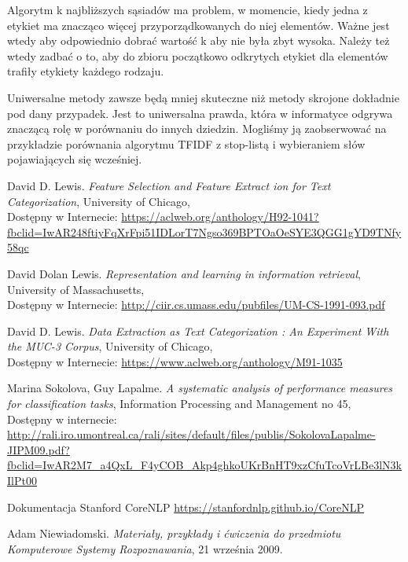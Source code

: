 \documentclass{classrep}
\begin{document}
	Algorytm k najbliższych sąsiadów ma problem, w momencie, kiedy jedna z etykiet ma znacząco więcej przyporządkowanych do niej elementów. Ważne jest wtedy aby odpowiednio dobrać wartość k aby nie była zbyt wysoka. Należy też wtedy zadbać o to, aby do zbioru początkowo odkrytych etykiet dla elementów trafiły etykiety każdego rodzaju.
	
	Uniwersalne metody zawsze będą mniej skuteczne niż metody skrojone dokładnie pod dany przypadek. Jest to uniwersalna prawda, która w informatyce odgrywa znaczącą rolę w porównaniu do innych dziedzin. Mogliśmy ją zaobserwować na przykładzie porównania algorytmu TFIDF z stop-listą i wybieraniem słów pojawiających się wcześniej.


\begin{thebibliography}{0}
   David D. Lewis.
  	\textsl{Feature Selection and Feature Extract ion for Text Categorization}, University of Chicago,\\
  	Dostępny w Internecie: \url {https://aclweb.org/anthology/H92-1041?fbclid=IwAR248ftiyFqXrFpi51IDLorT7Ngso369BPTOaOeSYE3QGG1gYD9TNfy58qc}

   David Dolan Lewis.
  	\textsl{Representation and learning in information retrieval}, University of Massachusetts,\\
  	Dostępny w Internecie: \url {http://ciir.cs.umass.edu/pubfiles/UM-CS-1991-093.pdf}

   David D. Lewis.
  	\textsl{Data Extraction as Text Categorization : An
Experiment With the MUC-3 Corpus}, University of Chicago,\\
	Dostępny w Internecie: \url {https://www.aclweb.org/anthology/M91-1035}

   Marina Sokolova, Guy Lapalme.
  	\textsl{A systematic analysis of performance measures for classification tasks}, Information Processing and Management no 45,\\
  	Dostępny w internecie: \url {http://rali.iro.umontreal.ca/rali/sites/default/files/publis/SokolovaLapalme-JIPM09.pdf?fbclid=IwAR2M7_a4QxL_F4yCOB_Akp4ghkoUKrBnHT9xzCfuTcoVrLBe3lN3kIlPt00}

   Dokumentacja Stanford CoreNLP
    \url {https://stanfordnlp.github.io/CoreNLP}
    
   Adam Niewiadomski.
  	\textsl{Materiały, przykłady i ćwiczenia do przedmiotu
Komputerowe Systemy Rozpoznawania}, 21 września 2009.\\

\end{thebibliography}
\end{document}
